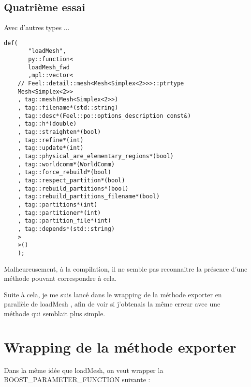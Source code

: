 \documentclass[12pt]{article}
\begin{document}
\newpage
\subsection{Quatrième essai}

Avec d'autres types ...
\begin{lstlisting}
def(
       "loadMesh",
       py::function<
       loadMesh_fwd
       ,mpl::vector<
    // Feel::detail::mesh<Mesh<Simplex<2>>>::ptrtype
    Mesh<Simplex<2>>
    , tag::mesh(Mesh<Simplex<2>>)
    , tag::filename*(std::string)
    , tag::desc*(Feel::po::options_description const&)
    , tag::h*(double)
    , tag::straighten*(bool)
    , tag::refine*(int)
    , tag::update*(int)
    , tag::physical_are_elementary_regions*(bool)
    , tag::worldcomm*(WorldComm)
    , tag::force_rebuild*(bool)
    , tag::respect_partition*(bool)
    , tag::rebuild_partitions*(bool)
    , tag::rebuild_partitions_filename*(bool)
    , tag::partitions*(int)
    , tag::partitioner*(int)
    , tag::partition_file*(int)
    , tag::depends*(std::string)
    >
    >()
    );
\end{lstlisting}

Malheureusement, à la compilation, il ne semble pas reconnaitre la présence d'une méthode pouvant correspondre à cela.

Suite à cela, je me suis lancé dans le wrapping de la méthode exporter en parallèle de loadMesh , afin de voir si j'obtenais la même erreur avec une méthode qui semblait plus simple.

\section{Wrapping de la méthode exporter }

Dans la même idée que loadMesh, on veut wrapper la BOOST\_PARAMETER\_FUNCTION suivante :
\end{document}
